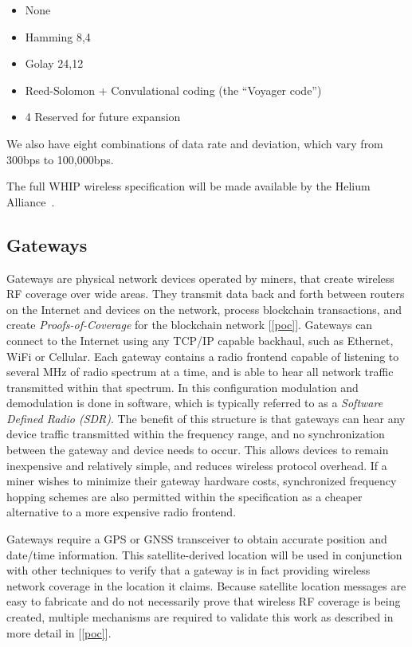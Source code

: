 \documentclass[letterpaper,11pt]{article}
\begin{document}
\begin{itemize}
	\item None
	\item Hamming 8,4
	\item Golay 24,12
	\item Reed-Solomon + Convulational coding (the ``Voyager code'')
	\item 4 Reserved for future expansion
\end{itemize}

We also have eight combinations of data rate and deviation, which vary from 300bps to 100,000bps.\newline

The full WHIP wireless specification will be made available by the Helium Alliance~\cite{alliance}.

\subsection{Gateways}\label{gateways}

Gateways are physical network devices operated by miners, that create wireless RF coverage over wide areas. They transmit data back and forth between routers on the Internet and devices on the network, process blockchain transactions, and create \emph{Proofs-of-Coverage} for the blockchain network [\ref{poc}]. Gateways can connect to the Internet using any TCP/IP capable backhaul, such as Ethernet, WiFi or Cellular. Each gateway contains a radio frontend capable of listening to several MHz of radio spectrum at a time, and is able to hear all network traffic transmitted within that spectrum. In this configuration modulation and demodulation is done in software, which is typically referred to as a \emph{Software Defined Radio (SDR)}. The benefit of this structure is that gateways can hear any device traffic transmitted within the frequency range, and no synchronization between the gateway and device needs to occur. This allows devices to remain inexpensive and relatively simple, and reduces wireless protocol overhead. If a miner wishes to minimize their gateway hardware costs, synchronized frequency hopping schemes are also permitted within the specification as a cheaper alternative to a more expensive radio frontend.\newline

Gateways require a GPS or GNSS transceiver to obtain accurate position and date/time information. This satellite-derived location will be used in conjunction with other techniques to verify that a gateway is in fact providing wireless network coverage in the location it claims. Because satellite location messages are easy to fabricate and do not necessarily prove that wireless RF coverage is being created, multiple mechanisms are required to validate this work as described in more detail in [\ref{poc}].\newline
\end{document}
